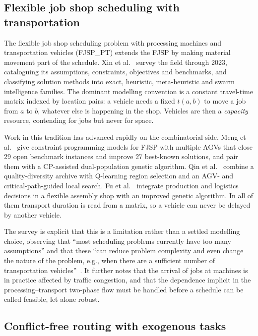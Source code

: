 \documentclass[manuscript,screen,review]{acmart}
\begin{document}
\subsection{Flexible job shop scheduling with transportation}

The flexible job shop scheduling problem with processing machines and
transportation vehicles (FJSP\_PT) extends the FJSP by making material movement
part of the schedule. Xin et al.~\cite{xin2025review} survey the field through
2023, cataloguing its assumptions, constraints, objectives and benchmarks, and
classifying solution methods into exact, heuristic, meta-heuristic and swarm
intelligence families. The dominant modelling convention is a constant
travel-time matrix indexed by location pairs: a vehicle needs a fixed $t(a,b)$
to move a job from $a$ to $b$, whatever else is happening in the shop. Vehicles are then
a \emph{capacity} resource, contending for jobs but never for space.

Work in this tradition has advanced rapidly on the combinatorial side. Meng et
al.~\cite{meng2025cp} give constraint programming models for FJSP with multiple
AGVs that close 29 open benchmark instances and improve 27 best-known solutions,
and pair them with a CP-assisted dual-population genetic algorithm. Qin et
al.~\cite{qin2026knowledge} combine a quality-diversity archive with Q-learning
region selection and an AGV- and critical-path-guided local search. Fu et
al.~\cite{fu2025integrated} integrate production and logistics decisions in a
flexible assembly shop with an improved genetic algorithm. In all of them
transport duration is read from a matrix, so a vehicle can never be delayed by
another vehicle.

The survey is explicit that this is a limitation rather than a settled
modelling choice, observing that ``most scheduling problems currently have too
many assumptions'' and that these ``can reduce problem complexity and even change
the nature of the problem, e.g., when there are a sufficient number of
transportation vehicles''~\cite{xin2025review}. It further notes that the
arrival of jobs at machines is in practice affected by traffic congestion, and
that the dependence implicit in the processing--transport two-phase flow must be
handled before a schedule can be called feasible, let alone robust.

\subsection{Conflict-free routing with exogenous tasks}
\end{document}
